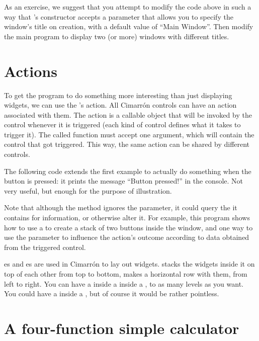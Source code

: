\documentclass[a4paper]{howto}
\newcommand{\Cimarron}[0]{Cimarrón}
\begin{document}
As an exercise, we suggest that you attempt to modify the code above in
such a way that 's constructor accepts a
parameter  that allows you to specify the window's title on
creation, with a default value of ``Main Window''. Then modify the main
program to display two (or more) windows with different titles.

\section{Actions}

To get the program to do something more interesting than just displaying
widgets, we can use the 's action. All \Cimarron{}
controls can have an action associated with them. The action is a
callable object that will be invoked by the control whenever it is
triggered (each kind of control defines what it takes to trigger
it). The called function must accept one argument, which will contain
the control that got triggered. This way, the same action can be shared
by different controls.

The following code extends the first example to actually do something
when the button is pressed: it prints the message ``Button pressed!'' in
the console. Not very useful, but enough for the purpose of
illustration.



Note that although the  method ignores the
 parameter, it could query the  it contains
for information, or otherwise alter it. For example, this program shows
how to use a  to create a stack of two buttons inside the
window, and one way to use the  parameter to influence the
action's outcome according to data obtained from the triggered control.



es and es are used in \Cimarron{} to lay out
widgets.  stacks the widgets inside it on top of each other
from top to bottom,  makes a horizontal row with them, from
left to right. You can have a  inside a  inside
a , to as many levels as you want. You could have a
 inside a , but of course it would be rather
pointless.

\section{A four-function simple calculator}
\end{document}
